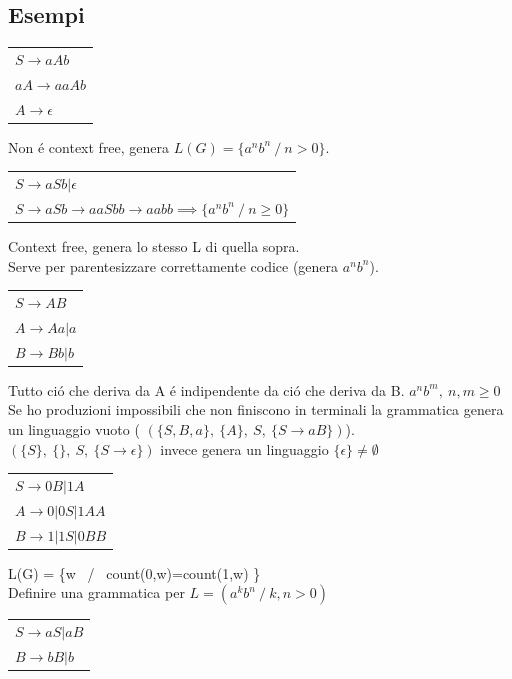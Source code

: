 \subsection{Esempi}
\begin{tabular}{l}
	$S \rightarrow aAb$\\
	$aA \rightarrow aaAb$\\
	$A \rightarrow \epsilon$\\
\end{tabular}
Non \'e context free, genera $L(G) = \{ a^nb^n\ / \ n>0 \}$.\\[5pt]
\begin{tabular}{l}
	$S \rightarrow aSb | \epsilon$\\
	$S \rightarrow aSb \rightarrow aaSbb \rightarrow aabb \implies \{a^nb^n\ / \ n \geq 0 \} $ \\
\end{tabular}
Context free, genera lo stesso L di quella sopra.\\
Serve per parentesizzare correttamente codice (genera $a^n b^n$).\\[5pt]
\begin{tabular}{l}
$S \rightarrow AB$\\
$A \rightarrow Aa|a$\\
$B \rightarrow Bb|b$\\
\end{tabular}
Tutto ci\'o che deriva da A \'e indipendente da ci\'o che deriva da B. ${a^{n}b^{m},\ n, m \geq 0}$\\[5pt]
Se ho produzioni impossibili che non finiscono in terminali la grammatica genera un linguaggio vuoto (
$(\{ S, B, a \},\ \{ A \} ,\ S,\ \{ S\rightarrow aB \})$).\\[5pt]
$(\{ S\} ,\ \{ \},\ S,\ \{ S \rightarrow \epsilon \} )$ invece genera un linguaggio $\{ \epsilon \} \not = \emptyset $\\[5pt]
\begin{tabular}{l}
$S \rightarrow 0B | 1A$\\
$A \rightarrow 0|0S|1AA$\\
$B \rightarrow 1|1S|0BB$\\
\end{tabular}
L(G) = \{w \ / \ count(0,w)=count(1,w) \}\\[5pt]
Definire una grammatica per $L = (a^kb^n \ / \ k, n > 0)$\\
\begin{tabular}{l}
	$S \rightarrow aS|aB$\\
	$B \rightarrow bB|b$\\
\end{tabular}

